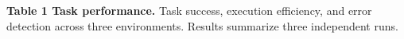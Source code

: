 \documentclass[10pt]{article}
\begin{document}
\newcommand{\ivgnotes}{}
\renewcommand{\ivgnote}[1]{\gdef\ivgnotes{#1}}

\par\vspace{6pt}
{\fontsize{8.8}{10.3}\selectfont\textsf{\textbf{Table 1 Task performance.}} Task success, execution efficiency, and error detection across three environments. Results summarize three independent runs. \ivgnotes\par}
\end{document}
